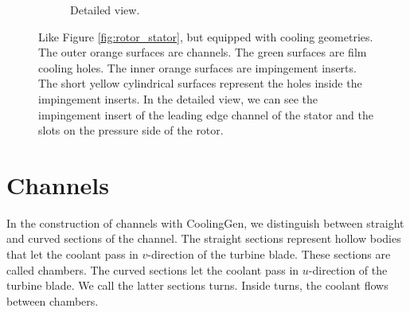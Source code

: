 \documentclass[a4paper, 11pt]{report}
\theoremstyle{definition}
\begin{document}
\begin{figure}[H]
\begin{subfigure}{.49\textwidth}
			\caption{Detailed view.}
		\end{subfigure}		
		\caption{Like Figure \ref{fig:rotor_stator}, but equipped with cooling geometries. The outer orange surfaces are channels. The green surfaces are film cooling holes. The inner orange surfaces are impingement inserts. The short yellow cylindrical surfaces represent the holes inside the impingement inserts. In the detailed view, we can see the impingement insert of the leading edge channel of the stator and the slots on the pressure side of the rotor.}
		\label{fig:results_complete}
	\end{figure}

\section{Channels}
	In the construction of channels with CoolingGen, we distinguish between straight and curved sections of the channel. The straight sections represent hollow bodies that let the coolant pass in $v$-direction of the turbine blade. These sections are called chambers. The curved sections let the coolant pass in $u$-direction of the turbine blade. We call the latter sections turns. Inside turns, the coolant flows between chambers.
\end{document}
